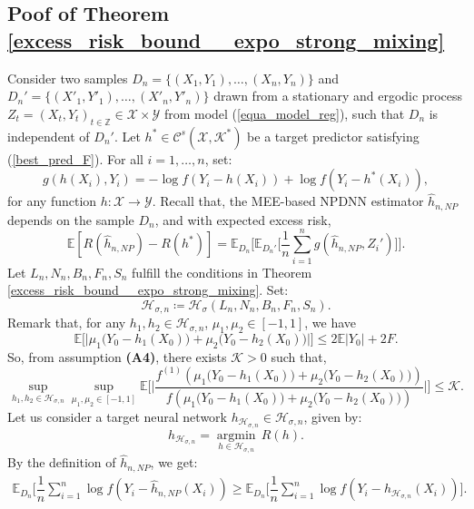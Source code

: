 \documentclass[10pt,twoside]{article}
\numberwithin{equation}{section}
\newcommand{\E}{\ensuremath{\mathbb{E}}}
\newcommand{\Z}{\ensuremath{\mathbb{Z}}}
\DeclareMathOperator*{\argmin}{argmin}
\newcommand{\mk}{ { \mathcal{K}} }
\begin{document}
 
 
\subsection{Poof of Theorem \ref{excess_risk_bound__expo_strong_mixing}}\label{Proof_excess_risk_thm1}
%

Consider two samples $ D_n = \{ (X_1, Y_1), \dots, (X_n, Y_n) \}$ and $ D_n' = \{ (X'_1, Y'_1), \dots, (X'_n, Y'_n) \}$ drawn from a stationary and ergodic process $Z_t = (X_t, Y_t)_{t\in \Z} \in \mathcal{X} \times \mathcal{Y}$ from model (\ref{equa_model_reg}), such that $D_n$ is independent of $D_n'$.
%
Let $h^{*} \in \mathcal{C}^{s}(\mathcal{X}, \mathcal{K}^{*})$ be a target predictor satisfying (\ref{best_pred_F}).
 For all $i= 1,\dots,n$, set:
%
\begin{equation}\label{equa_proof_decomp_excess_risk_V1}
g(h(X_i), Y_i) = -\log f(Y_i - h(X_i)) + \log f(Y_i - h^*(X_i)),
\end{equation}
%
for any function $h : \mathcal{X} \to \mathcal{Y}$. 
%
 Recall that, the MEE-based NPDNN estimator $\widehat{h}_{n,NP}$ depends on the sample $D_n$, and with expected excess risk,
%
%
\begin{equation}\label{equa_proof_excess_risk_v0}
\E[R(\widehat{h}_{n,NP}) - R(h^*) ]=  \E_{D_n} \Big[\E_{D_n'} \Big[\dfrac{1}{n} \sum_{i=1}^n g(\widehat{h}_{n,NP}, Z_i')\Big] \Big].
\end{equation}
%
%
Let $L_n, N_n, B_n, F_n, S_n$ fulfill the conditions in Theorem \ref{excess_risk_bound__expo_strong_mixing}. 
Set:
%
\begin{equation}\label{proof_def_H_sigma_n}
\mathcal{H}_{\sigma, n} \coloneqq \mathcal{H}_{\sigma}(L_n, N_n, B_n, F_n, S_n).
\end{equation}
%
%
%
Remark that, for any $h_1, h_2 \in \mathcal{H}_{\sigma, n}$, $\mu_1, \mu_2 \in [-1,1]$, we have
\[ \E\big[ \big| \mu_1 \big(Y_0-h_1(X_0) \big)  + \mu_2 \big(Y_0-h_2(X_0) \big)  \big|   \big] \leq  2 \E|Y_0| + 2F .  \]
%
So, from assumption \textbf{(A4)}, there exists 
$\mk >0$ such that,
%
\begin{equation}\label{appl_A4_K}
 \sup_{h_1, h_2 \in \mathcal{H}_{\sigma, n} } \sup_{\mu_1, \mu_2 \in [-1, 1]}  \E\Big[ \Big| \dfrac{ f^{(1)}(\mu_1 \big(Y_0-h_1(X_0) \big)  + \mu_2 \big(Y_0-h_2(X_0) \big)) }{ f(\mu_1 \big(Y_0-h_1(X_0) \big)  + \mu_2 \big(Y_0-h_2(X_0) \big)) } \Big| \Big] \leq \mathcal{K} .
\end{equation}
%
%
Let us consider a target neural network $h_{\mathcal{H}_{\sigma, n}} \in \mathcal{H}_{\sigma, n}$, given by:
%
\begin{equation*}
 h_{\mathcal{H}_{\sigma, n}} = \underset{h\in \mathcal{H}_{\sigma, n} }{\argmin}\, R(h).   
\end{equation*}
%
%
By the definition of $\widehat{h}_{n,NP}$, we get:
%
\begin{align}\label{equa_proof_app_ERM_V0}
 \E_{D_n}\Big[\dfrac{1}{n} \sum_{i=1}^n \log f(Y_i - \widehat{h}_{n,NP}(X_i)) \ge \E_{D_n}\Big[\dfrac{1}{n} \sum_{i=1}^n \log f(Y_i -h_{\mathcal{H}_{\sigma, n}}(X_i))\Big].
\end{align}
\end{document}
